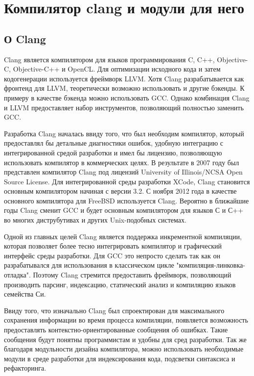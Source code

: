 \chapter{Компилятор clang и модули для него}

\section{О Clang}
Clang является компилятором для языков программирования C, C++, Objective-C, Objective-C++ и OpenCL.
Для оптимизации исходного кода и затем кодогенерации используется фреймворк LLVM. Хотя Clang разрабатывается
как фронтенд для LLVM, теоретически возможно использовать и другие бэкенды. К примеру в качестве бэкенда
можно использовать GCC. Однако комбинация Clang и LLVM предоставляет набор инструментов, 
позволяющий полностью заменить GCC. 

Разработка Clang началась ввиду того, что был необходим компилятор, который предоставлял бы 
детальные диагностики ошибок, удобную интеграцию с интегрированной средой разработки и имел бы
лицензию, позволяющую использовать компилятор в коммерческих целях. В результате в 2007 году был 
представлен компилятор Clang под лицензий University of Illinois/NCSA Open Source License.
Для интегрированной среды разработки XCode, Clang становится основным компилятором начиная с версии 3.2.
С ноября 2012 года в качестве основного компилятора для FreeBSD используется Clang. Вероятно в ближайшие годы
Clang сменит GCC и будет основным компилятором для языков С и С++ во многих диструбутивах и
других Unix-подобных системах.

Одной из главных целей Clang является поддержка инкрементной компиляции, которая позволяет более
тесно интегрировать компилятор и графический интерфейс среды разработки. Для GCC это непросто 
сделать так как он разрабатывался для использования в классическом цикле "компиляция-линковка-отладка".
Поэтому Clang стремится предоставить фреймворк, позволяющий производить парсинг, индексацию, 
статический анализ и компиляцию языков семейства Си. 

Ввиду того, что изначально Clang был спроектирован для максимального сохранения информации во время 
процесса компиляции, появляется возможность предоставлять контекстно-ориентированные сообщения об ошибках.
Такие сообщения будут понятны программистам и удобны для сред разработки. Так же благодаря 
модульности дизайна компилятора, можно использовать необходимые модули в среде разработки для
индексирования кода, подсветки синтаксиса и рефакторинга.

